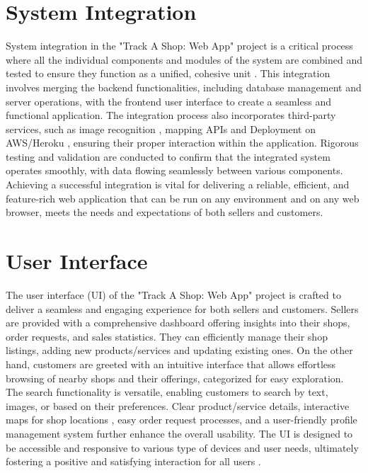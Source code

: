 \section{System Integration}
System integration in the "Track A Shop: Web App" project is a critical process where all the individual components and modules of the system are combined and tested to ensure they function as a unified, cohesive unit \citep{smith2017microservices}. This integration involves merging the backend functionalities, including database management and server operations, with the frontend user interface to create a seamless and functional application. The integration process also incorporates third-party services, such as image recognition \citep{aws-rekognition}, mapping APIs \citep{google-maps-docs} and Deployment on AWS/Heroku \citep{heroku-docs}, ensuring their proper interaction within the application. Rigorous testing and validation are conducted to confirm that the integrated system operates smoothly, with data flowing seamlessly between various components.\\
Achieving a successful integration is vital for delivering a reliable, efficient, and feature-rich web application that can be run on any environment and on any web browser, meets the needs and expectations of both sellers and customers. 

\section{User Interface}
The user interface (UI) of the "Track A Shop: Web App" project is crafted to deliver a seamless and engaging experience for both sellers and customers. Sellers are provided with a comprehensive dashboard offering insights into their shops, order requests, and sales statistics. They can efficiently manage their shop listings, adding new products/services and updating existing ones. On the other hand, customers are greeted with an intuitive interface that allows effortless browsing of nearby shops and their offerings, categorized for easy exploration. The search functionality is versatile, enabling customers to search by text, images, or based on their preferences. Clear product/service details, interactive maps for shop locations \citep{google-maps-docs}, easy order request processes, and a user-friendly profile management system further enhance the overall usability. The UI is designed to be accessible and responsive to various type of devices and user needs, ultimately fostering a positive and satisfying interaction for all users \citep{wiki-hci}.
\newpage

